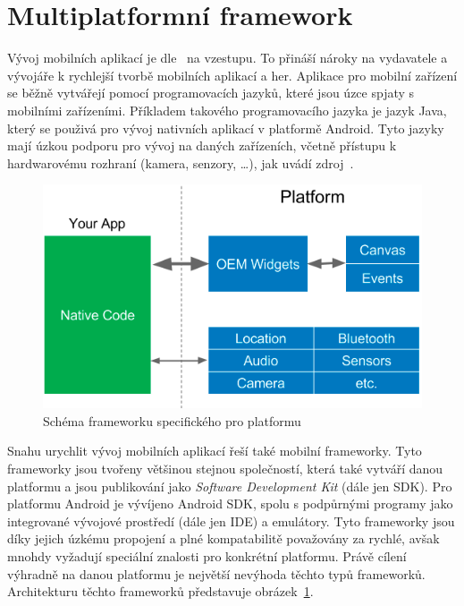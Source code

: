 \section{Multiplatformní framework}

Vývoj mobilních aplikací je dle~\cite{wepc_video_game_statistics} na vzestupu.
To přináší nároky na vydavatele a vývojáře k rychlejší tvorbě mobilních
aplikací a her. 
Aplikace pro mobilní zařízení se běžně vytvářejí pomocí programovacích jazyků,
které jsou úzce spjaty s mobilními zařízeními.
Příkladem takového programovacího jazyka je jazyk Java,
který se použivá pro vývoj nativních aplikací v platformě Android.
Tyto jazyky mají úzkou podporu pro vývoj na daných zařízeních,
včetně přístupu k hardwarovému rozhraní (kamera, senzory, \dots{}),
jak uvádí zdroj~\cite{dashmagazine_mobile_frameworks}. 

\begin{figure}[ht!]
    \centering
    \includegraphics[width=\linewidth]{assets/technology-research/framework/platform_sdk.png}
    \caption{Schéma frameworku specifického pro platformu ~\cite{hackernoon_flutter}}
    \label{fig:framework_platform}
\end{figure}

Snahu urychlit vývoj mobilních aplikací řeší také mobilní frameworky.
Tyto frameworky jsou tvořeny většinou stejnou společností,
která také vytváří danou platformu
a jsou publikování jako \emph{Software Development Kit} (dále jen SDK).
\cite{dashmagazine_mobile_frameworks}
Pro platformu Android je vývíjeno Android SDK,
spolu s podpůrnými programy jako integrované vývojové prostředí
(dále jen IDE) a emulátory.
Tyto frameworky jsou díky jejich úzkému propojení a plné kompatabilitě
považovány za rychlé,
avšak mnohdy vyžadují speciální znalosti pro konkrétní platformu.
Právě cílení výhradně na danou platformu je největší nevýhoda těchto typů
frameworků.
Architekturu těchto frameworků představuje obrázek~\ref{fig:framework_platform}.

